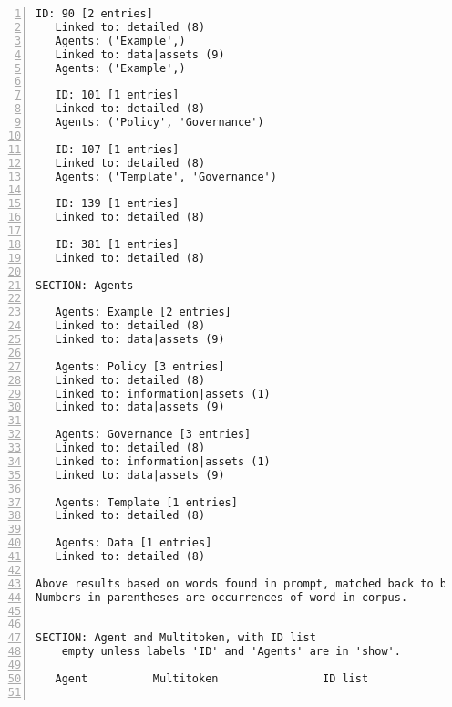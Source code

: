 \documentclass[10pt]{article}
\begin{document}
{\begin{lstlisting}[numbers=left,basicstyle=\ttfamily\footnotesize, frame=none]
   ID: 90 [2 entries]                                              ID: 42 [1 entries]
   Linked to: detailed (8)                                         Linked to: data|assets (9)
   Agents: ('Example',)                                            Agents: ('Policy', 'Governance')
   Linked to: data|assets (9)                                      
   Agents: ('Example',)                                            ID: 48 [1 entries]
                                                                   Linked to: data|assets (9)
   ID: 101 [1 entries]                                             Agents: ('Policy', 'Governance')
   Linked to: detailed (8)                                         
   Agents: ('Policy', 'Governance')                                ID: 199 [1 entries]
                                                                   Linked to: data|assets (9)
   ID: 107 [1 entries]                                             Agents: ('Policy', 'Governance')
   Linked to: detailed (8)                                         
   Agents: ('Template', 'Governance')                              ID: 259 [1 entries]
                                                                   Linked to: data|assets (9)
   ID: 139 [1 entries]                                             Agents: ('Governance',)
   Linked to: detailed (8)        
    
   ID: 381 [1 entries]     
   Linked to: detailed (8)      

SECTION: Agents

   Agents: Example [2 entries]
   Linked to: detailed (8)
   Linked to: data|assets (9)

   Agents: Policy [3 entries]
   Linked to: detailed (8)
   Linked to: information|assets (1)
   Linked to: data|assets (9)

   Agents: Governance [3 entries]
   Linked to: detailed (8)
   Linked to: information|assets (1)
   Linked to: data|assets (9)

   Agents: Template [1 entries]
   Linked to: detailed (8)

   Agents: Data [1 entries]
   Linked to: detailed (8)

Above results based on words found in prompt, matched back to backend tables.
Numbers in parentheses are occurrences of word in corpus.


SECTION: Agent and Multitoken, with ID list
    empty unless labels 'ID' and 'Agents' are in 'show'.

   Agent          Multitoken                ID list


\end{lstlisting}}
\end{document}
